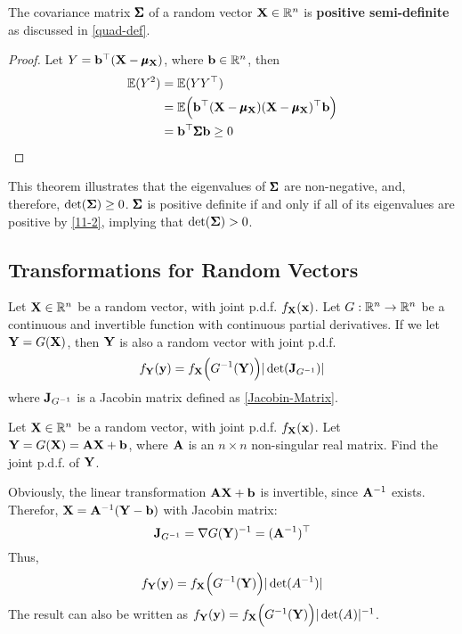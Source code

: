     \begin{Thm}
        The covariance matrix $\pmb{\Sigma}$ of a random vector $\mathbf{X}\in \mathbb{R}^n$ is \textbf{positive semi-definite} as discussed in \cref{quad-def}.
        \begin{proof}
            Let $Y = \mathbf{b}^{\top}(\mathbf{X} - \pmb{\mu}_{\mathbf{X}})$, where $\mathbf{b}\in\mathbb{R}^n$, then
            \begin{align*}
                \mathbb{E}(Y^2) &= \mathbb{E}(YY^{\top})\\
                & = \mathbb{E}\Big(\mathbf{b}^{\top}(\mathbf{X} - \pmb{\mu}_{\mathbf{X}})(\mathbf{X} - \pmb{\mu}_{\mathbf{X}})^{\top}\mathbf{b} \Big)\\
                & = \mathbf{b}^{\top}\pmb{\Sigma} \mathbf{b} \geq 0
            \end{align*}
        \end{proof}
        This theorem illustrates that the eigenvalues of $\pmb{\Sigma}$ are non-negative, and, therefore, $\det(\mathbf{\Sigma}) \geq 0$. $\pmb{\Sigma}$ is positive definite if and only if all of its eigenvalues are positive by \cref{11-2}, implying that $\det(\mathbf{\Sigma}) > 0$. 
    \end{Thm}

    \subsection{Transformations for Random Vectors}
    \begin{Thm}\label{trans-random}
        Let $\mathbf{X}\in\mathbb{R}^n$ be a random vector, with joint p.d.f. $\pdfn{X}$. Let $G:\mathbb{R}^n\to \mathbb{R}^n$ be a continuous and invertible function with continuous partial derivatives. If we let $\mathbf{Y} = G(\mathbf{X})$, then $\mathbf{Y}$ is also a random vector with joint p.d.f.
        \begin{equation}
            \pdfn{Y} = f_{\B{X}}\Big(G^{-1}(\B{Y}) \Big) |\det(\B{J}_{G^{-1}}) |  
        \end{equation}
        where $\mathbf{J}_{G^{-1}}$ is a Jacobin matrix defined as \cref{Jacobin-Matrix}.
    \end{Thm}
    \begin{Ex}\label{linear-trans}
        Let $\mathbf{X}\in\mathbb{R}^n$ be a random vector, with joint p.d.f. $\pdfn{X}$. Let $\mathbf{Y} = G(\mathbf{X}) = \mathbf{AX} + \mathbf{b}$, where $\mathbf{A}$ is an $n\times n$ non-singular real matrix. Find the joint p.d.f. of $\mathbf{Y}$.
        \begin{sol}
            Obviously, the linear transformation $\mathbf{AX} + \mathbf{b}$ is invertible, since $\mathbf{A}^{-1}$ exists. Therefor, $\mathbf{X}  = \mathbf{A}^{-1}(\mathbf{Y} - \mathbf{b})$ with Jacobin matrix:
            \begin{equation}
                \mathbf{J}_{G^{-1}} = \nabla G(\mathbf{Y})^{-1} = (\mathbf{A}^{-1})^{\top}
            \end{equation}
            Thus,
            \begin{equation}
                \pdfn{Y} = f_{\B{X}}\Big(G^{-1}(\B{Y}) \Big) |\det(A^{-1})|
            \end{equation}
            The result can also be written as $\pdfn{Y} = f_{\B{X}}\Big(G^{-1}(\B{Y}) \Big) |\det(A^{})|^{-1}$.
        \end{sol}
    \end{Ex}
